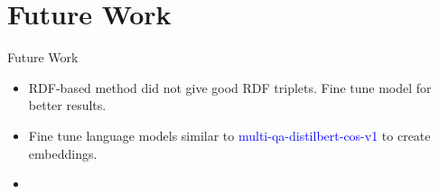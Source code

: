 \documentclass[aspectratio=169]{beamer}
\begin{document}
\section{Future Work}
\begin{frame}{Future Work}
\begin{itemize}
	\item RDF-based method did not give good RDF triplets. Fine tune model for better results.
	\item Fine tune language models similar to \textcolor{blue}{multi-qa-distilbert-cos-v1} to create embeddings.
	\item 
\end{itemize}
\end{frame}
\begin{frame}

\end{frame}



%      		
\end{document}
